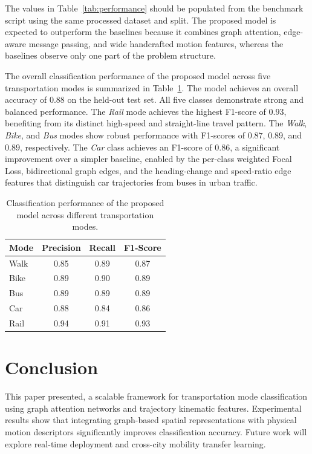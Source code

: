 \documentclass[conference]{IEEEtran}
\begin{document}
The values in Table~\ref{tab:performance} should be populated from the benchmark script using the same processed dataset and split. The proposed model is expected to outperform the baselines because it combines graph attention, edge-aware message passing, and wide handcrafted motion features, whereas the baselines observe only one part of the problem structure.


The overall classification performance of the proposed model across five transportation modes is summarized in Table~\ref{tab:classification_report}. The model achieves an overall accuracy of $0.88$ on the held-out test set. All five classes demonstrate strong and balanced performance. The \textit{Rail} mode achieves the highest F1-score of $0.93$, benefiting from its distinct high-speed and straight-line travel pattern. The \textit{Walk}, \textit{Bike}, and \textit{Bus} modes show robust performance with F1-scores of $0.87$, $0.89$, and $0.89$, respectively. The \textit{Car} class achieves an F1-score of $0.86$, a significant improvement over a simpler baseline, enabled by the per-class weighted Focal Loss, bidirectional graph edges, and the heading-change and speed-ratio edge features that distinguish car trajectories from buses in urban traffic.

\begin{table}[htbp]
\centering
\caption{Classification performance of the proposed model across different transportation modes.}
\label{tab:classification_report}
\begin{tabular}{lccc}
\toprule
\textbf{Mode} & \textbf{Precision} & \textbf{Recall} & \textbf{F1-Score} \\
\midrule
Walk & 0.85 & 0.89 & 0.87\\
Bike & 0.89 & 0.90 & 0.89\\
Bus  & 0.89 & 0.89 & 0.89\\
Car  & 0.88 & 0.84 & 0.86\\
Rail & 0.94 & 0.91 & 0.93\\
\bottomrule
\end{tabular}
\end{table}

\section{Conclusion}

This paper presented, a scalable framework for transportation mode classification using graph attention networks and trajectory kinematic features. Experimental results show that integrating graph-based spatial representations with physical motion descriptors significantly improves classification accuracy. Future work will explore real-time deployment and cross-city mobility transfer learning.



\end{document}

